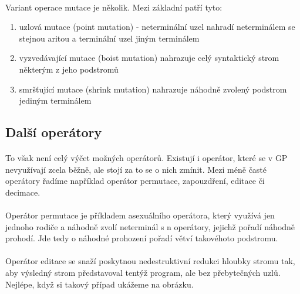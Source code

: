 \documentclass[bc,male,java,dept460]{diploma}		%
\begin{document}

\paragraph*{}
Variant operace mutace je několik. Mezi základní patří tyto:
\begin{enumerate}
\item uzlová mutace (point mutation) - neterminální uzel nahradí neterminálem se stejnou aritou a terminální uzel jiným terminálem
\item vyzvedávající mutace (boist mutation) nahrazuje celý syntaktický strom některým z jeho podstromů
\item smršťující mutace (shrink mutation) nahrazuje náhodně zvolený podstrom jediným terminálem
\end{enumerate}

\subsection{Další operátory}
\paragraph*{}
To však není celý výčet možných operátorů. Existují i operátor, které se v GP nevyužívají zcela běžně, ale stojí za to se o nich zmínit. Mezi méně časté operátory řadíme například operátor permutace, zapouzdření, editace či decimace.

\paragraph*{}
Operátor permutace je příkladem asexuálního operátora, který využívá jen jednoho rodiče a náhodně zvolí neterminál s n operátory, jejichž pořadí náhodně prohodí. Jde tedy o náhodné prohození pořadí větví takovéhoto podstromu.

\paragraph*{}
Operátor editace se snaží poskytnou nedestruktivní redukci hloubky stromu tak, aby výsledný strom představoval tentýž program, ale bez přebytečných uzlů. Nejlépe, když si takový případ ukážeme na obrázku.

\end{document}
